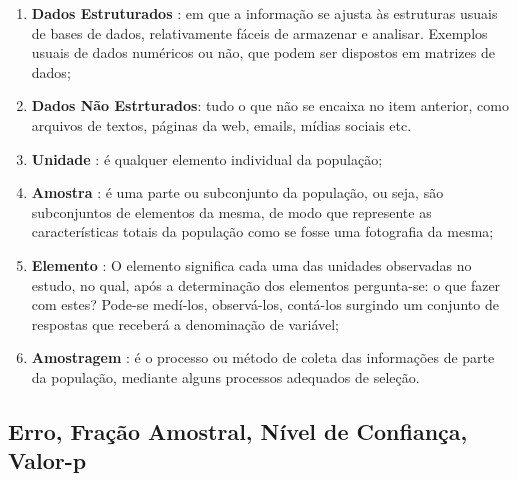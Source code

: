 \begin{enumerate}

\item \textbf{Dados Estruturados} : em que a informação se ajusta às estruturas
usuais de bases de dados, relativamente fáceis de armazenar e analisar.
Exemplos usuais de dados numéricos ou não, que podem ser dispostos
em matrizes de dados;
\item \textbf{Dados Não Estrturados}: tudo o que não se encaixa no item anterior, como arquivos de textos, páginas da web, emails, mídias sociais etc.
\item \textbf{Unidade} : é qualquer elemento individual da população;
\item \textbf{Amostra} : é uma parte ou subconjunto da população, ou seja, são subconjuntos de elementos da mesma, de modo que represente as características totais da população como se fosse uma fotografia da mesma;
\item \textbf{Elemento} : O elemento significa cada uma das unidades observadas no estudo, no qual, após a determinação dos elementos pergunta-se: o que fazer com estes? Pode-se medí-los, observá-los, contá-los surgindo um conjunto de respostas que receberá a denominação de variável;

\item \textbf{Amostragem} : é o processo ou método de coleta das informações de parte da população, mediante alguns processos adequados de seleção.
\end{enumerate}

\subsection{Erro, Fração Amostral, Nível de Confiança, Valor-p}

